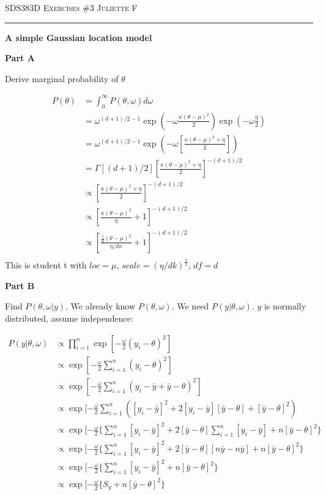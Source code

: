 \documentclass[12pt]{amsart}
\begin{document}
\thispagestyle{empty}

{\scshape SDS383D} \hfill {\scshape \Large Exercises \#3} \hfill {\scshape Juliette F}
 \medskip
\hrule
\bigskip
\bigskip

{\bf \large A simple Gaussian location model} 
\bigskip




{\bf Part A} 
\bigskip

Derive marginal probability of $\theta$

\begin{align*}
    P(\theta)&=\int_{0}^{\infty} P(\theta, \omega)d \omega \\
    &= \omega^{(d+1)/2-1}\exp\left(-\omega \frac{\kappa \left(\theta -\mu \right)^2}{2}\right)\exp\left(-\omega \frac{\eta }{2}\right)\\
    &= \omega^{(d+1)/2-1}\exp\left(-\omega \left[ \frac{\kappa \left(\theta -\mu \right)^2+\eta}{2} \right]\right)\\
    &= \Gamma[(d+1)/2] \left[ \frac{\kappa \left(\theta -\mu \right)^2+\eta}{2}\right]^{-(d+1)/2}\\
    & \propto \left[ \frac{\kappa \left(\theta -\mu \right)^2+\eta}{2}\right]^{-(d+1)/2}\\
    & \propto \left[ \frac{\kappa \left(\theta -\mu \right)^2}{\eta}+1\right]^{-(d+1)/2}\\
     & \propto \left[ \frac{\frac{1}{d} \left(\theta -\mu \right)^2}{\eta/d\kappa}+1\right]^{-(d+1)/2}\\
\end{align*}
This is student t with $loc=\mu$, $scale=(\eta/dk)^\frac{1}{2}$, $df=d$

\bigskip




{\bf Part B} 
\bigskip

Find $P(\theta, \omega|y)$. We already know $P(\theta, \omega)$. We need $P(y|\theta, \omega)$. $y$ is normally distributed, assume independence:

\begin{align*}
    P(y|\theta, \omega) & \propto  \prod_{i=1}^{n} \exp[-\frac{\omega}{2}(y_i-\theta)^2] \\
    & \propto   \exp[-\frac{\omega}{2}\sum_{i=1}^{n}(y_i-\theta)^2] \\
    & \propto   \exp[-\frac{\omega}{2}\sum_{i=1}^{n}(y_i - \bar{y} + \bar{y}-\theta)^2] \\
     & \propto   \exp[-\frac{\omega}{2}\sum_{i=1}^{n}([y_i - \bar{y}]^2 + 2[y_i - \bar{y}][\bar{y}-\theta]+ [\bar{y}-\theta]^2) \\
      & \propto   \exp[-\frac{\omega}{2} \{\sum_{i=1}^{n}[y_i - \bar{y}]^2 + 2[\bar{y}-\theta] \sum_{i=1}^{n}[y_i - \bar{y}]+ n[\bar{y}-\theta]^2 \}\\
      & \propto   \exp[-\frac{\omega}{2} \{\sum_{i=1}^{n}[y_i - \bar{y}]^2 + 2[\bar{y}-\theta] [n\bar{y} - n\bar{y}]+ n[\bar{y}-\theta]^2 \}\\
      & \propto   \exp[-\frac{\omega}{2} \{\sum_{i=1}^{n}[y_i - \bar{y}]^2+ n[\bar{y}-\theta]^2 \}\\
      & \propto   \exp[-\frac{\omega}{2} \{S_y+ n[\bar{y}-\theta]^2 \}\\
\end{align*}
\end{document}
